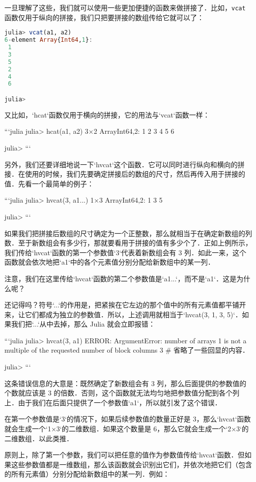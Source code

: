 一旦理解了这些，我们就可以使用一些更加便捷的函数来做拼接了．比如，\verb|vcat|函数仅用于纵向的拼接，我们只把要拼接的数组传给它就可以了：

\begin{lstlisting}[language=julia]
julia> vcat(a1, a2)
6-element Array{Int64,1}:
 1
 3
 5
 2
 4
 6

julia>
\end{lstlisting}

又比如，`hcat`函数仅用于横向的拼接，它的用法与`vcat`函数一样：

```julia
julia> hcat(a1, a2)
3×2 Array{Int64,2}:
 1  2
 3  4
 5  6

julia> 
```

另外，我们还要详细地说一下`hvcat`这个函数．它可以同时进行纵向和横向的拼接．在使用的时候，我们先要确定拼接后的数组的尺寸，然后再传入用于拼接的值．先看一个最简单的例子：

```julia
julia> hvcat(3, a1...)
1×3 Array{Int64,2}:
 1  3  5

julia> 
```

如果我们把拼接后数组的尺寸确定为一个正整数，那么就相当于在确定新数组的列数．至于新数组会有多少行，那就要看用于拼接的值有多少个了．正如上例所示，我们传给`hvcat`函数的第一个参数值`3`代表着新数组会有 3 列．如此一来，这个函数就会依次地把`a1`中的各个元素值分别分配给新数组中的某一列．

注意，我们在这里传给`hvcat`函数的第二个参数值是`a1...`，而不是`a1`．这是为什么呢？

还记得吗？符号`...`的作用是，把紧挨在它左边的那个值中的所有元素值都平铺开来，让它们都成为独立的参数值．所以，上述调用就相当于`hvcat(3, 1, 3, 5)`．如果我们把`...`从中去掉，那么 Julia 就会立即报错：

```julia
julia> hvcat(3, a1)
ERROR: ArgumentError: number of arrays 1 is not a multiple of the requested number of block columns 3
# 省略了一些回显的内容．

julia> 
```

这条错误信息的大意是：既然确定了新数组会有 3 列，那么后面提供的参数值的个数就应该是 3 的倍数．否则，这个函数就无法均匀地把参数值分配到各个列上．由于我们在后面只提供了一个参数值`a1`，所以就引发了这个错误．

在第一个参数值是`3`的情况下，如果后续参数值的数量正好是 3，那么`hvcat`函数就会生成一个`1×3`的二维数组．如果这个数量是 6，那么它就会生成一个`2×3`的二维数组．以此类推．

原则上，除了第一个参数，我们可以把任意的值作为参数值传给`hvcat`函数．但如果这些参数值都是一维数组，那么该函数就会识别出它们，并依次地把它们（包含的所有元素值）分别分配给新数组中的某一列．例如：

